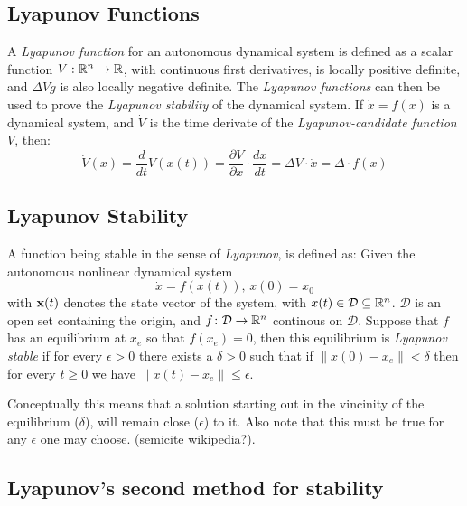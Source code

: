 \subsection{Lyapunov Functions}

A \textit{Lyapunov function} for an autonomous dynamical system is defined as a
scalar function \(V: \mathbb{R}^n \rightarrow \mathbb{R}\), with continuous first derivatives,
is locally positive definite, and \(\Delta V \dot g\) is also locally negative
definite. The \textit{Lyapunov functions} can then be used to prove the
\textit{Lyapunov stability} of the dynamical system. If \(\dot{x} = f(x)\) is a
dynamical system, and \(\dot{V}\) is the time derivate of the
\textit{Lyapunov-candidate function} \(V\), then:
\[
  \dot{V}(x) = \frac{d}{dt}V(x(t)) = \frac{\partial V}{\partial x} \cdot
  \frac{dx}{dt} = \Delta V \cdot \dot{x} = \Delta \cdot f(x)
\]

\subsection{Lyapunov Stability}

A function being stable in the sense of \textit{Lyapunov}, is defined as: Given
the autonomous nonlinear dynamical system
\[
  \dot{x} = f(x(t)), \, x(0) = x_0
\]
with \(\mathbf{x}(t)\) denotes the state vector of the system, with \(x(t) \in
\mathcal{D} \subseteq \mathbb{R}^n\). \(\mathcal{D}\) is an open set containing the
origin, and \(f \colon \mathcal{D} \rightarrow \mathbb{R}^n\) continous on
\(\mathcal{D}\). Suppose that \(f\) has an equilibrium at \(x_e\) so that
\(f(x_e) = 0\), then this equilibrium is \textit{Lyapunov stable} if for every
\(\epsilon > 0\) there exists a \(\delta > 0\) such that if \(\left \lVert x(0)
  - x_e \right \rVert < \delta\) then for every \(t \geq 0\) we have \( \lVert
x(t) - x_e \rVert \leq \epsilon\).

Conceptually this means that a solution starting out in the vincinity of the
equilibrium (\(\delta\)), will remain close (\(\epsilon\)) to it. Also note that
this must be true for any \(\epsilon\) one may choose. (semicite wikipedia?).

\subsection{Lyapunov's second method for stability}

